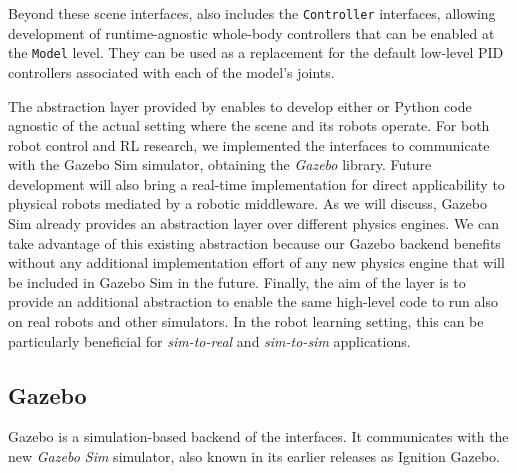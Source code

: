 Beyond these scene interfaces, \scenario also includes the \verb|Controller| interfaces, allowing development of runtime-agnostic whole-body controllers that can be enabled at the \verb|Model| level.
They can be used as a replacement for the default low-level PID controllers associated with each of the model's joints.

The abstraction layer provided by \scenario enables to develop either \cpp or Python code agnostic of the actual setting where the scene and its robots operate.
For both robot control and \ac{RL} research, we implemented the \scenario interfaces to communicate with the Gazebo Sim simulator, obtaining the \emph{\scenario Gazebo} library.
Future development will also bring a real-time implementation for direct applicability to physical robots mediated by a robotic middleware.
As we will discuss, Gazebo Sim already provides an abstraction layer over different physics engines.
We can take advantage of this existing abstraction because our \scenario Gazebo backend benefits without any additional implementation effort of any new physics engine that will be included in Gazebo Sim in the future.
Finally, the aim of the \scenario layer is to provide an additional abstraction to enable the same high-level code to run also on real robots and other simulators.
In the robot learning setting, this can be particularly beneficial for \emph{sim-to-real} and \emph{sim-to-sim} applications.

\subsection{\scenario Gazebo}
\label{sec:scenario_gazebo}

\scenario Gazebo is a simulation-based backend of the \scenario interfaces.
It communicates with the new \emph{Gazebo Sim} simulator, also known in its earlier releases as Ignition Gazebo.

